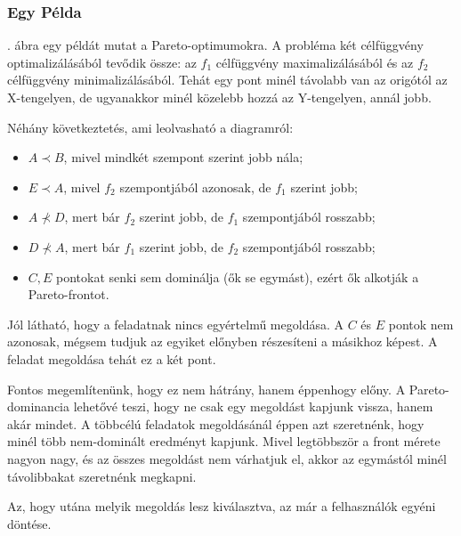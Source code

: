 \subsubsection{Egy Példa}
. ábra egy példát mutat a Pareto-optimumokra.
A probléma két célfüggvény optimalizálásából tevődik össze: az $f_1$ célfüggvény maximalizálásából és az $f_2$ célfüggvény minimalizálásából.
Tehát egy pont minél távolabb van az origótól az X-tengelyen, de ugyanakkor minél közelebb hozzá az Y-tengelyen, annál jobb.

Néhány következtetés, ami leolvasható a diagramról:
\begin{itemize}
  \item[\textbullet] $A \prec B$, mivel mindkét szempont szerint jobb nála;
  \item[\textbullet] $E \prec A$, mivel $f_2$ szempontjából azonosak, de $f_1$ szerint jobb;
  \item[\textbullet] $A \nprec D$, mert bár $f_2$ szerint jobb, de $f_1$ szempontjából rosszabb;
  \item[\textbullet] $D \nprec A$, mert bár $f_1$ szerint jobb, de $f_2$ szempontjából rosszabb;
  \item[\textbullet] $C, E$ pontokat senki sem dominálja (ők se egymást), ezért ők alkotják a Pareto-frontot.
\end{itemize}

Jól látható, hogy a feladatnak nincs egyértelmű megoldása.
A $C$ és $E$ pontok nem azonosak, mégsem tudjuk az egyiket előnyben részesíteni a másikhoz képest.
A feladat megoldása tehát ez a két pont.

Fontos megemlítenünk, hogy ez nem hátrány, hanem éppenhogy előny.
A Pareto-dominancia lehetővé teszi, hogy ne csak egy megoldást kapjunk vissza, hanem akár mindet.
A többcélú feladatok megoldásánál éppen azt szeretnénk, hogy minél több nem-dominált eredményt kapjunk.
Mivel legtöbbször a front mérete nagyon nagy, és az összes megoldást nem várhatjuk el, akkor az egymástól minél távolibbakat szeretnénk megkapni.

Az, hogy utána melyik megoldás lesz kiválasztva, az már a felhasználók egyéni döntése.

